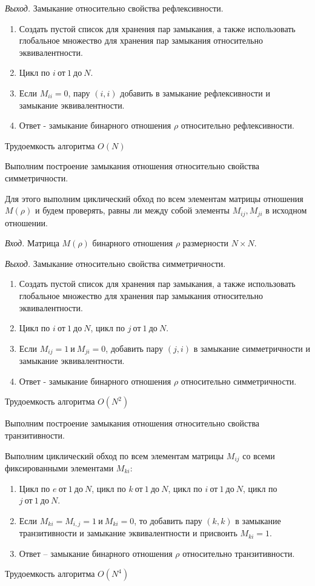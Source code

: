 \documentclass[bachelor, och, labwork]{shiza}
\begin{document}
\textit{Выход.} Замыкание относительно свойства рефлексивности.

\begin{enumerate}
    \item Создать пустой список для хранения пар замыкания, а также использовать
    глобальное множество для хранения пар замыкания относительно эквивалентности.
    \item Цикл по $i ~\text{от}~ 1 ~\text{до}~ N$.
    \item Если $M_{ii} = 0$, пару $(i, i)$ добавить в замыкание 
    рефлексивности и замыкание эквивалентности.    
    \item Ответ - замыкание бинарного отношения $\rho$ относительно рефлексивности.
\end{enumerate}
Трудоемкость алгоритма $O(N)$

Выполним построение замыкания отношения относительно свойства 
симметричности.

Для этого выполним циклический обход по всем элементам матрицы 
отношения $M(\rho)$ и будем проверять, равны ли между собой элементы 
$M_{ij},M_{ji}$ в исходном отношении.

\textit{Вход.} Матрица $M(\rho)$ бинарного отношения $\rho$ размерности
$N \times N$.

\textit{Выход.} Замыкание относительно свойства симметричности.

\begin{enumerate}
    \item Создать пустой список для хранения пар замыкания, а также использовать
    глобальное множество для хранения пар замыкания относительно эквивалентности.
    \item Цикл по $i ~\text{от}~ 1 ~\text{до}~ N$, цикл по $j ~\text{от}~ 1 ~\text{до}~ N$.
    \item Если $M_{ij} = 1 ~\text{и}~ M_{ji} = 0$, добавить пару $(j, i)$
    в замыкание симметричности и замыкание эквивалентности.
    \item Ответ - замыкание бинарного отношения $\rho$ относительно симметричности.
\end{enumerate}
Трудоемкость алгоритма $O(N^2)$

Выполним построение замыкания отношения относительно свойства транзитивности.

Выполним циклический обход по всем элементам матрицы $M_{ij}$ со всеми
фиксированными элементами $M_{ki}$:

\begin{enumerate}
    \item Цикл по $e ~\text{от}~ 1 ~\text{до}~ N$, цикл по $k ~\text{от}~ 1 ~\text{до}~ N$, 
    цикл по $i ~\text{от}~ 1 ~\text{до}~ N$, цикл по $j ~\text{от}~ 1 ~\text{до}~ N$.
    \item Если $M_{ki}=M_{i,j}=1 ~\text{и}~ M_{ki}=0$, то добавить пару
    $(k, k)$ в замыкание транзитивности и замыкание эквивалентности и присвоить
    $M_{ki}=1$.
    \item Ответ -- замыкание бинарного отношения $\rho$ относительно транзитивности.
\end{enumerate}
Трудоемкость алгоритма $O(N^4)$
\end{document}

